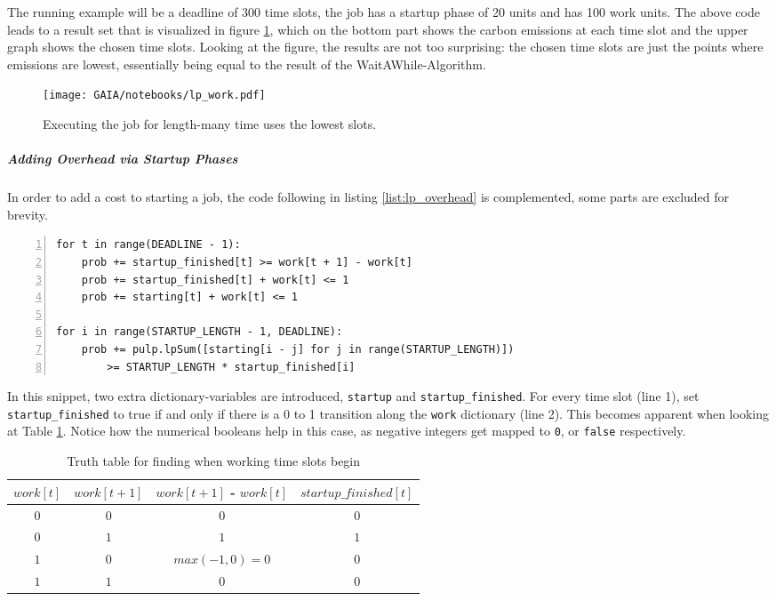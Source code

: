 The running example will be a deadline of 300 time slots, the job has a startup phase of 20 units and has 100 work units. 
The above code leads to a result set that is visualized in figure \ref{fig:lp_work},
which on the bottom part shows the carbon emissions at each time slot and the upper graph shows the chosen time slots.
Looking at the figure, the results are not too surprising: the chosen time slots are just the points where emissions are lowest, essentially being equal to the result of the WaitAWhile-Algorithm.

\begin{figure}
    \texttt{[image: GAIA/notebooks/lp\_work.pdf]}
    \caption{Executing the job for length-many time uses the lowest slots.}
    \label{fig:lp_work}
\end{figure}    

\subparagraph{Adding Overhead via Startup Phases}

In order to add a cost to starting a job, the code following in listing \ref{list:lp_overhead} is complemented, some parts are excluded for brevity.

\begin{minipage}{\linewidth} %
\begin{lstlisting}[frame=single, numbers=left, caption={LP Implementation for overhead}, label={list:lp_overhead}, basicstyle=\ttfamily]
for t in range(DEADLINE - 1):
    prob += startup_finished[t] >= work[t + 1] - work[t]
    prob += startup_finished[t] + work[t] <= 1
    prob += starting[t] + work[t] <= 1

for i in range(STARTUP_LENGTH - 1, DEADLINE):
    prob += pulp.lpSum([starting[i - j] for j in range(STARTUP_LENGTH)]) 
        >= STARTUP_LENGTH * startup_finished[i]
\end{lstlisting}
\end{minipage}


In this snippet, two extra dictionary-variables are introduced, \verb|startup| and \verb|startup_finished|.
For every time slot (line 1), set \verb|startup_finished| to true if and only if there is a 0 to 1 transition along the \verb|work| dictionary (line 2). This becomes apparent when looking at Table \ref{tab:truth_table_startup_finished}.
Notice how the numerical booleans help in this case, as negative integers get mapped to \verb|0|, or \verb|false| respectively.

\begin{table}[h!]
\centering
\begin{tabular}{|c|c|c|c|}
\hline
    $work[t]$ & $work[t+1]$ & $work[t+1]$ - $work[t]$ & $startup\_finished[t]$ \\ \hline
    $0$ & $0$ & $0$ & $0$ \\ \hline
    $0$ & $1$ & $1$ & $1$ \\ \hline
    $1$ & $0$ & $max(-1, 0) = 0$ & $0$ \\ \hline
    $1$ & $1$ & $0$ & $0$ \\ \hline
\end{tabular}
\caption{Truth table for finding when working time slots begin}
\label{tab:truth_table_startup_finished}
\end{table}

